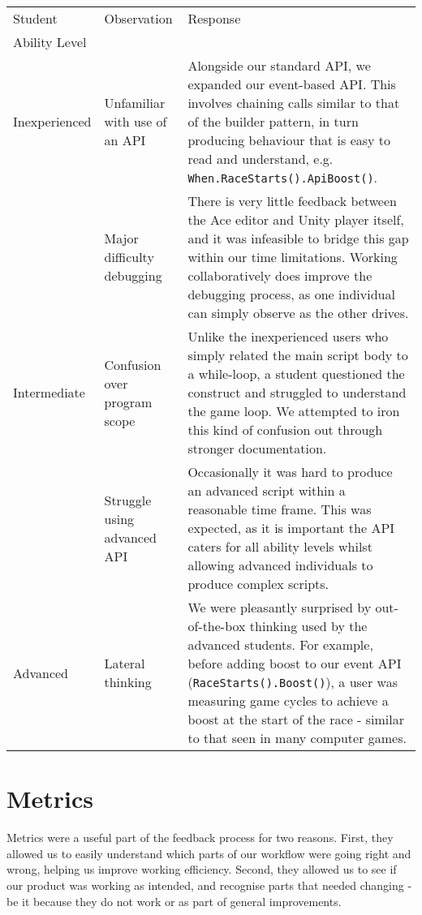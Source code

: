 \begin{tabularx}{\textwidth}{ | X | X | p{} |}
\hline
Student & Observation & Response\\
Ability Level & & \\
\hline\hline
Inexperienced 
& Unfamiliar with use of an API 
	& Alongside our standard API, we expanded our event-based API. This involves chaining calls similar to that of the builder pattern, in turn producing behaviour that is easy to read and understand, e.g. {\tt When.RaceStarts().ApiBoost()}. \\ \cline{2-3}
& Major difficulty debugging 
	& There is very little feedback between the Ace editor and Unity player itself, and it was infeasible to bridge this gap within our time limitations. Working collaboratively does improve the debugging process, as one individual can simply observe as the other drives.\\  \hline
Intermediate 
& Confusion over program scope 
	& Unlike the inexperienced users who simply related the main script body to a while-loop, a student questioned the construct and struggled to understand the game loop. We attempted to iron this kind of confusion out through stronger documentation. \\ \cline{2-3}
& Struggle using advanced API 
	& Occasionally it was hard to produce an advanced script within a reasonable time frame. This was expected, as it is important the API caters for all ability levels whilst allowing advanced individuals to produce complex scripts.\\ \hline
Advanced 
& Lateral thinking 
	& We were pleasantly surprised by out-of-the-box thinking used by the advanced students. For example, before adding boost to our event API ({\tt RaceStarts().Boost()}), a user was measuring game cycles to achieve a boost at the start of the race - similar to that seen in many computer games.  \\
\hline
\end{tabularx}

\section{Metrics}
Metrics were a useful part of the feedback process for two reasons. First, they allowed us to easily understand which parts of our workflow were going right and wrong, helping us improve working efficiency. Second, they allowed us to see if our product was working as intended, and recognise parts that needed changing - be it because they do not work or as part of general improvements.

